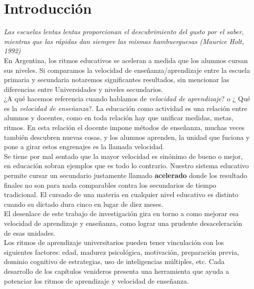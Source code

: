 
\chapter{Introducci\'on}
\textit{Las escuelas lentas lentas proporcionan el descubrimiento del gusto por el saber, mientras que las r\'apidas dan siempre las mismas hambuerguesas (Maurice Holt, 
1992)\\}
En Argentina, los ritmos educativos se aceleran a medida que los alumnos cursan sus niveles. Si comparamos la velocidad de ense\~nanza/aprendizaje entre la escuela 
primaria y secundaria notaremos significantes resultados, sin mencionar las diferencias entre Universidades y niveles secundarios.\\
¿A qu\'e hacemos referencia cuando hablamos de \textit{velocidad de aprendizaje}? o ¿ Qu\'e es la \textit{velocidad de ense\~nanza}?. La educaci\'on como 
actividad es una relaci\'on entre alumnos y docentes, como en toda relaci\'on hay que unificar medidas, metas, ritmos. En esta relaci\'on el docente impone 
m\'etodos de ense\~nanza, muchas veces tambi\'en descubren nuevas cosas, y los alumnos aprenden, la unidad que fuciona y pone a girar estos engrenajes es la llamada velocidad.\\
Se tiene por mal sentado que la mayor velocidad es sin\'onimo de bueno o mejor, en educaci\'on sobran ejemplos que es todo lo contrario. Nuestro sistema 
educativo permite cursar un secundario justamente llamado \textbf{acelerado} donde los resultado finales no son para nada comparables contra los secundarios  de
tiempo tradicional. El cursado de una materia en cualquier nivel educativo es distinto cuando su dictado dura cinco en lugar de diez meses.\\
El desenlace de este trabajo de investigaci\'on gira en torno a como mejorar esa velocidad de aprendizaje y ense\~nanza, como lograr una prudente desaceleraci\'on
de esas unidades.\\
Los ritmos de aprendizaje universitarios pueden tener vinculaci\'on con los siguientes factores: edad, madurez psicol\'ogica, motivaci\'on, preparaci\'on 
previa, dominio cognitivo de estrategias, uso de inteligencias m\'ultiples, etc. Cada desarrollo de los cap\'itulos venideros presenta una herramienta que 
ayuda a potenciar los ritmos de aprendizaje y velocidad de ense\~nanza.


